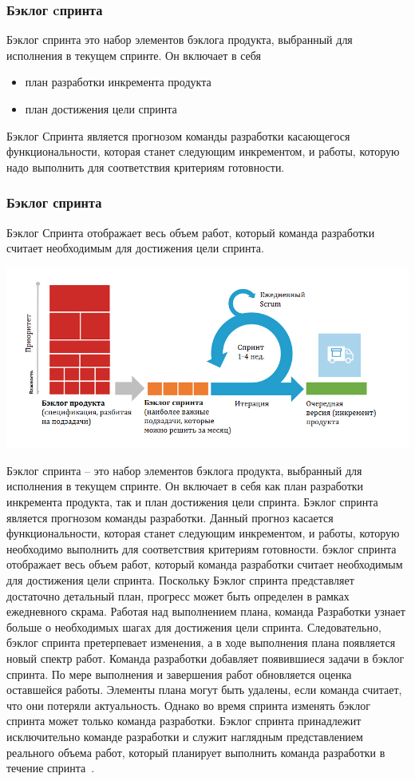 \documentclass{../industrial-development}
\begin{document}
\begin{frame} \frametitle {Бэклог cпринта}
\begin {block}{Бэклог спринта }
это набор элементов бэклога продукта, выбранный для исполнения в текущем спринте. Он включает в себя 
\begin{itemize}
	\item план разработки инкремента продукта
	\item план достижения цели спринта
\end{itemize}
\end{block} 
Бэклог Спринта является \alert{прогнозом} команды разработки касающегося
функциональности, которая станет следующим инкрементом, и работы, которую
надо выполнить для соответствия критериям готовности.
\end {frame} 

\begin{frame} \frametitle{Бэклог спринта}

 \alert{Бэклог Спринта} отображает весь объем работ, который команда разработки считает
необходимым для достижения цели спринта.
\centerline{\includegraphics[height=0.6\textheight]{scrum.png}}
\end{frame}

\lecturenotes
Бэклог спринта – это набор элементов бэклога продукта, выбранный для исполнения в
текущем спринте. Он включает в себя как план разработки инкремента продукта, так и
план достижения цели спринта.
Бэклог спринта является прогнозом команды разработки. Данный прогноз касается
функциональности, которая станет следующим инкрементом, и работы, которую
необходимо выполнить для соответствия критериям готовности.
бэклог спринта отображает весь объем работ, который команда разработки считает
необходимым для достижения цели спринта.
Поскольку Бэклог спринта представляет достаточно детальный план, прогресс может
быть определен в рамках ежедневного скрама. Работая над выполнением плана, команда
Разработки узнает больше о необходимых шагах для достижения цели спринта.
Следовательно, бэклог спринта претерпевает изменения, а в ходе выполнения плана
появляется новый спектр работ.
Команда разработки добавляет появившиеся задачи в бэклог спринта. По мере
выполнения и завершения работ обновляется оценка оставшейся работы. Элементы плана
могут быть удалены, если команда считает, что они потеряли актуальность. Однако во
время спринта изменять бэклог спринта может только команда разработки.
Бэклог спринта принадлежит исключительно команде разработки и служит наглядным
представлением реального объема работ, который планирует выполнить команда
разработки в течение спринта~\cite{Scrum}.
\end{document}
